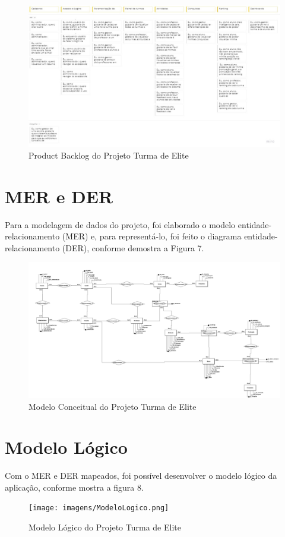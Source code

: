 \begin{figure}[htb]
    \centering
	\includegraphics[width=16cm]{imagens/ProductBacklog.jpg}
	\caption{Product Backlog do Projeto Turma de Elite}
\end{figure}
\FloatBarrier

\section{MER e DER}
Para a modelagem de dados do projeto, foi elaborado o modelo entidade-relacionamento (MER) e, para representá-lo, foi feito o diagrama entidade-relacionamento (DER), conforme demostra a Figura 7.

\begin{figure}[htb]
    \centering
	\includegraphics[width=16cm]{imagens/ModeloConceitual.png}
	\caption{Modelo Conceitual do Projeto Turma de Elite}
\end{figure}
\FloatBarrier


\section{Modelo Lógico}
Com o MER e DER mapeados, foi possível desenvolver o modelo lógico da aplicação, conforme mostra a figura 8.

\begin{figure}[htb]
    \centering
	\texttt{[image: imagens/ModeloLogico.png]}
	\caption{Modelo Lógico do Projeto Turma de Elite}
\end{figure}
\FloatBarrier
